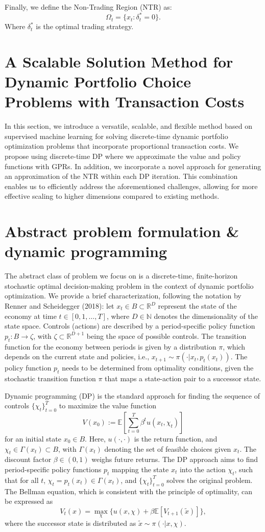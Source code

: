 \documentclass[10pt,a4paper]{article}
\numberwithin{equation}{section} %
\begin{document}
Finally, we define the Non-Trading Region (NTR) as:
\[
\Omega_t = \{ x_t : \delta^*_t = 0 \}.
\]
Where $\delta_t^*$ is the optimal trading strategy.
\section{A Scalable Solution Method for Dynamic Portfolio Choice Problems with Transaction Costs}

In this section, we introduce a versatile, scalable, and flexible method based on supervised machine learning for solving discrete-time dynamic portfolio optimization problems that incorporate proportional transaction costs.
We propose using discrete-time DP where we approximate the value and policy
functions with GPRs. In addition, we incorporate a novel approach for generating an approximation
of the NTR within each DP iteration. This combination enables us to efficiently address
the aforementioned challenges, allowing for more effective scaling to higher dimensions
compared to existing methods.\\

\section{Abstract problem formulation \& dynamic programming}
The abstract class of problem we focus on is a discrete-time, finite-horizon stochastic
optimal decision-making problem in the context of dynamic portfolio optimization.
We provide a brief characterization, following the notation by Renner and Scheidegger
(2018): let $x_t \in B \subset \mathbb{R}^D$ represent the state of the economy at time $t \in [0, 1, \ldots, T]$, 
where $D \in \mathbb{N}$ denotes the dimensionality of the state space. Controls (actions) are
described by a period-specific policy function $p_t : B \rightarrow \zeta$, with $\zeta \subset \mathbb{R}^{D+1}$ 
being the space of possible controls. The transition function for the economy between periods 
is given by a distribution $\pi$, which depends on the current state and policies, i.e., 
$x_{t+1} \sim \pi(\cdot | x_t, p_t(x_t))$. The policy function $p_t$ needs to be determined 
from optimality conditions, given the stochastic transition function $\pi$ that maps a 
state-action pair to a successor state.

Dynamic programming (DP) is the standard approach for finding the sequence of controls 
$\{\chi_t\}_{t=0}^T$ to maximize the value function 
\[
V(x_0) := \mathbb{E} \left[\sum_{t=0}^T \beta^t u(x_t, \chi_t)\right]
\]
for an initial state $x_0 \in B$. Here, $u(\cdot, \cdot)$ is the return function, 
and $\chi_t \in \Gamma(x_t) \subset B$, with $\Gamma(x_t)$ denoting the set of feasible 
choices given $x_t$. The discount factor $\beta \in (0, 1)$ weighs future returns. 
The DP approach aims to find period-specific policy functions $p_t$ mapping the state $x_t$ 
into the action $\chi_t$, such that for all $t$, $\chi_t = p_t(x_t) \in \Gamma(x_t)$, and 
$\{\chi_t\}_{t=0}^T$ solves the original problem. The Bellman equation, which is consistent 
with the principle of optimality, can be expressed as 
\[
V_t(x) = \max_{\chi} \{u(x, \chi) + \beta \mathbb{E}[V_{t+1}(\tilde{x})]\},
\]
where the successor state is distributed as $\tilde{x} \sim \pi(\cdot | x, \chi)$.
\end{document}
